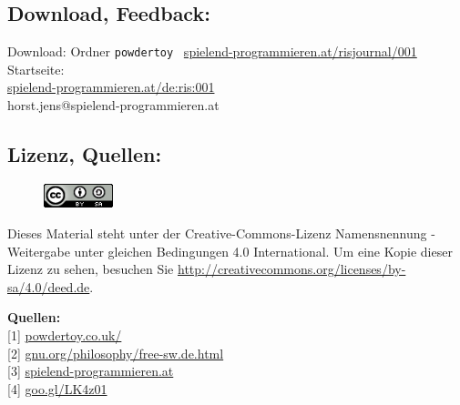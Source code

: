 \documentclass[10pt,a4paper,ngerman,twoside]{article} %
\newcommand{\SepRule}{\noindent	%
\begin{center}
\rule{250pt}{1pt} %
\end{center}
}
\begin{document}
\begin{multicols}{2}
\subsection*{Download, Feedback:}
\footnotesize{
Download: Ordner \texttt{powdertoy} \Mundus\ \href{http://spielend-programmieren.at/risjournal/001}{spielend-programmieren.at/risjournal/001}\\
Startseite:\\
\href{http://spielend-programmieren.at/de:ris:001}{spielend-programmieren.at/de:ris:001}\\ 
\Letter\:  horst.jens@spielend-programmieren.at \\}
\normalsize{}

\subsection*{Lizenz, Quellen:}
\begin{figure}
\includegraphics[width=2cm]{powdertoy/ccbysa88x31.png}
\end{figure}
Dieses Material steht unter der Creative-Commons-Lizenz Namensnennung - Weitergabe unter gleichen Bedingungen 4.0 International. Um eine Kopie dieser Lizenz zu sehen, besuchen Sie \url{http://creativecommons.org/licenses/by-sa/4.0/deed.de}.

\textbf{Quellen:} \\
{[}1{]} \href{http://powdertoy.co.uk/}{powdertoy.co.uk/} \\
{[}2{]} \href{http://www.gnu.org/philosophy/free-sw.de.html}{gnu.org/philosophy/free-sw.de.html} \\
{[}3{]} \href{http://spielend-programmieren.at}{spielend-programmieren.at} \\
{[}4{]} \href{http://goo.gl/LK4z01}{goo.gl/LK4z01} \\
\end{multicols}
\end{document}
